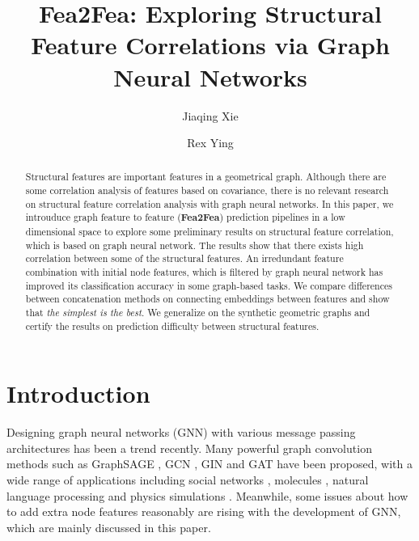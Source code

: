 \documentclass[runningheads]{llncs}
\begin{document}
\title{Fea2Fea: Exploring Structural Feature Correlations via Graph Neural Networks}
\vspace{-2cm}
\author{Jiaqing Xie \and Rex Ying}
\vspace{-2cm}
\maketitle              \vspace{-1cm}
\begin{abstract}
Structural features are important features in a geometrical graph. Although there are some correlation analysis of features based on covariance, there is no relevant research on structural feature correlation analysis with graph neural networks. In this paper, we introuduce graph feature to feature 
(\textbf{Fea2Fea}) prediction pipelines in a low dimensional space to 
explore some preliminary results on structural feature correlation, which is based on graph neural network. The results show that there exists high 
correlation between some of the structural features. An irredundant feature combination with initial node features, which is filtered by graph neural network has improved its classification accuracy in some graph-based tasks. We compare differences between concatenation methods on connecting embeddings between features and show that \textit{the simplest is the best}. We generalize on the synthetic geometric graphs and certify the results on prediction difficulty between structural features. 
\vspace{-0.2cm}
\end{abstract}
\vspace{-1cm}
\section{Introduction}
\vspace{-0.4cm}
Designing graph neural networks (GNN) with various message passing architectures has been a trend recently. Many powerful graph convolution methods such as GraphSAGE \cite{hamilton2017inductive}, GCN \cite{kipf2016semi}, GIN \cite{xu2018powerful} and GAT \cite{velivckovic2017graph} have been proposed, with a wide range of applications including social networks \cite{Qiu_2018,Wang_2019,zhang2018link}, molecules  \cite{jin2019learning,Kearnes_2016,knyazev2018spectral,Xu_2019}, natural language processing \cite{palm2018recurrent,rahimi-etal-2018-semi,sorokin-gurevych-2018-modeling} and physics simulations \cite{sanchezgonzalez2020learning,seo*2020physicsaware}. Meanwhile, some issues about how to add extra node features reasonably are rising with the development of GNN, which are mainly discussed in this paper.
\end{document}
